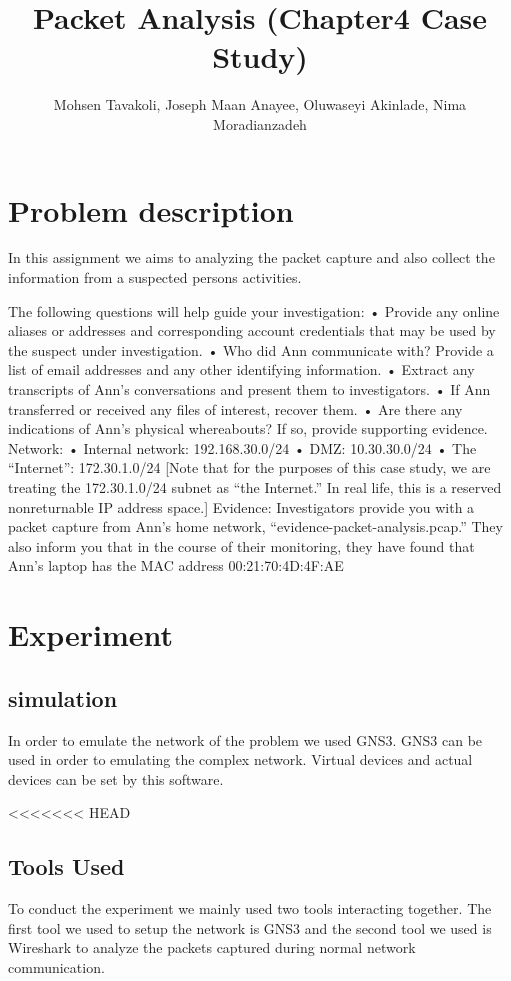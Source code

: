 \documentclass{article}
\title{Packet Analysis (Chapter4 Case Study)}
\author{Mohsen Tavakoli, Joseph Maan Anayee, Oluwaseyi Akinlade, Nima Moradianzadeh}
\begin{document}
\maketitle

\section{Problem description}
In this assignment we aims to analyzing the packet capture and also collect the information from a suspected persons activities.
 
The following questions will help guide your investigation:
• Provide any online aliases or addresses and corresponding account credentials that
may be used by the suspect under investigation.
• Who did Ann communicate with? Provide a list of email addresses and any other
identifying information.
• Extract any transcripts of Ann’s conversations and present them to investigators.
• If Ann transferred or received any files of interest, recover them.
• Are there any indications of Ann’s physical whereabouts? If so, provide supporting
evidence.
Network:
• Internal network: 192.168.30.0/24
• DMZ: 10.30.30.0/24
• The “Internet”: 172.30.1.0/24 [Note that for the purposes of this case study, we are
treating the 172.30.1.0/24 subnet as “the Internet.” In real life, this is a reserved nonreturnable
IP address space.]
Evidence: Investigators provide you with a packet capture from Ann’s home network,
“evidence-packet-analysis.pcap.” They also inform you that in the course of their monitoring,
they have found that Ann’s laptop has the MAC address 00:21:70:4D:4F:AE
\section{Experiment}
\subsection{simulation}
In order to emulate the network of the problem we used GNS3. GNS3 can be used in order to emulating the complex network. Virtual devices and actual devices can be set by this software\cite{amyot2014system}.



<<<<<<< HEAD
\subsection{Tools Used}
To conduct the experiment we mainly used two tools interacting together. The first tool we used to setup the network is GNS3 and the second tool we used is Wireshark to analyze the packets captured during normal network communication.
\end{document}
